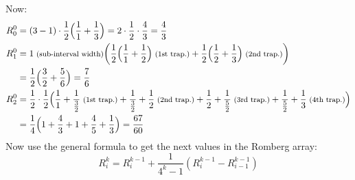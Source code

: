 \begin{example}
\begin{center}
    \end{center}
    Now:
    \begin{align*}
        R_0^0 &= (3 - 1) \cdot \frac{1}{2} \Bigl(\frac{1}{1} + \frac{1}{3}\Bigr) = 
        2 \cdot \frac{1}{2} \cdot \frac{4}{3} = \frac{4}{3}
        \\
        R_1^0 &= 1 {\footnotesize\text{ (sub-interval width)}} \biggl(
            \frac{1}{2} \Bigl( \frac{1}{1} + \frac{1}{2} \Bigr){\footnotesize\text{ (1st trap.)}} + 
            \frac{1}{2} \Bigl(\frac{1}{2} + \frac{1}{3} \Bigr){\footnotesize\text{ (2nd trap.)}}
        \biggr)
        \\&= 
        \frac{1}{2} \Bigl(\frac{3}{2} + \frac{5}{6}\Bigr) = \frac{7}{6}
        \\
        R_2^0 &= \frac{1}{2} \cdot \frac{1}{2} \Bigl(
            \frac{1}{1} + \frac{1}{\frac{3}{2}} {\footnotesize\text{ (1st trap.)}} + 
            \frac{1}{\frac{3}{2}} + \frac{1}{2} {\footnotesize\text{ (2nd trap.)}} + 
            \frac{1}{2} + \frac{1}{\frac{5}{2}} {\footnotesize\text{ (3rd trap.)}} + 
            \frac{1}{\frac{5}{2}} + \frac{1}{3} {\footnotesize\text{ (4th trap.)}}
        \Bigr)
        \\&= \frac{1}{4} \Bigl(1 + \frac{4}{3} + 1 + \frac{4}{5} + \frac{1}{3}\Bigr) =
        \frac{67}{60}
    \end{align*}
    Now use the general formula to get the next values in the Romberg array:
    \[
    R_i^k = R_i^{k-1} + \frac{1}{4^k - 1} (R_i^{k-1} - R_{i-1}^{k-1})
    \]
    \begin{center}
\end{center}
\end{example}
